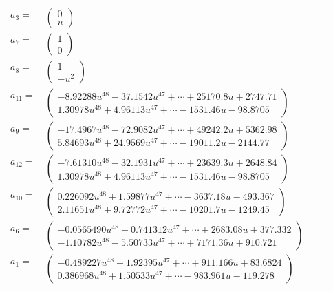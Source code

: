 \documentclass[1p]{elsarticle_modified}
\theoremstyle{definition}
\begin{document}
\begin{tabular}{m{7pt} m{180pt} m{7pt} m{180pt} }
\flushright $a_{3}=$&$\begin{pmatrix}0\\u\end{pmatrix}$ \\
\flushright $a_{7}=$&$\begin{pmatrix}1\\0\end{pmatrix}$ \\
\flushright $a_{8}=$&$\begin{pmatrix}1\\- u^2\end{pmatrix}$ \\
\flushright $a_{11}=$&$\begin{pmatrix}-8.92288 u^{48}-37.1542 u^{47}+\cdots+25170.8 u+2747.71\\1.30978 u^{48}+4.96113 u^{47}+\cdots-1531.46 u-98.8705\end{pmatrix}$ \\
\flushright $a_{9}=$&$\begin{pmatrix}-17.4967 u^{48}-72.9082 u^{47}+\cdots+49242.2 u+5362.98\\5.84693 u^{48}+24.9569 u^{47}+\cdots-19011.2 u-2144.77\end{pmatrix}$ \\
\flushright $a_{12}=$&$\begin{pmatrix}-7.61310 u^{48}-32.1931 u^{47}+\cdots+23639.3 u+2648.84\\1.30978 u^{48}+4.96113 u^{47}+\cdots-1531.46 u-98.8705\end{pmatrix}$ \\
\flushright $a_{10}=$&$\begin{pmatrix}0.226092 u^{48}+1.59877 u^{47}+\cdots-3637.18 u-493.367\\2.11651 u^{48}+9.72772 u^{47}+\cdots-10201.7 u-1249.45\end{pmatrix}$ \\
\flushright $a_{6}=$&$\begin{pmatrix}-0.0565490 u^{48}-0.741312 u^{47}+\cdots+2683.08 u+377.332\\-1.10782 u^{48}-5.50733 u^{47}+\cdots+7171.36 u+910.721\end{pmatrix}$ \\
\flushright $a_{1}=$&$\begin{pmatrix}-0.489227 u^{48}-1.92395 u^{47}+\cdots+911.166 u+83.6824\\0.386968 u^{48}+1.50533 u^{47}+\cdots-983.961 u-119.278\end{pmatrix}$ \\

\end{tabular}
\end{document}
